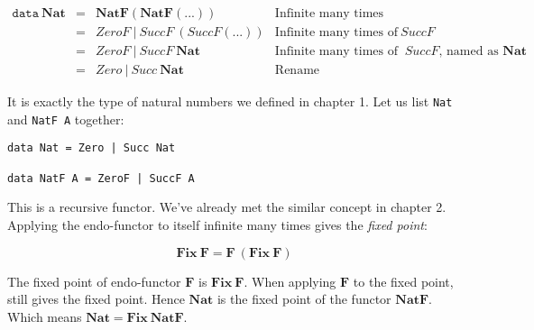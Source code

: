 \documentclass{article}
\begin{document}
\[
\begin{array}{rcll}
\texttt{data}\ \mathbf{Nat} & = & \mathbf{NatF}(\mathbf{NatF}(...)) & \text{Infinite many times} \\
         & = & ZeroF\ |\ SuccF\ (SuccF (...)) & \text{Infinite many times of}\ SuccF \\
         & = & ZeroF\ |\ SuccF\ \mathbf{Nat} & \text{Infinite many times of }\ SuccF \text{, named as }\mathbf{Nat} \\
         & = & Zero\ |\ Succ\ \mathbf{Nat} & \text{Rename}
\end{array}
\]

It is exactly the type of natural numbers we defined in chapter 1. Let us list \texttt{Nat} and \texttt{NatF A} together:

\begin{lstlisting}
data Nat = Zero | Succ Nat

data NatF A = ZeroF | SuccF A
\end{lstlisting}

This is a recursive functor. We've already met the similar concept in chapter 2. Applying the endo-functor to itself infinite many times gives the {\em fixed point}:

\[
\mathbf{Fix}\ \mathbf{F} = \mathbf{F}\ (\mathbf{Fix}\ \mathbf{F})
\]

The fixed point of endo-functor $\mathbf{F}$ is $\mathbf{Fix}\ \mathbf{F}$. When applying $\mathbf{F}$ to the fixed point, still gives the fixed point. Hence $\mathbf{Nat}$ is the fixed point of the functor $\mathbf{NatF}$. Which means $\mathbf{Nat} = \mathbf{Fix}\ \mathbf{NatF}$.

\end{document}
